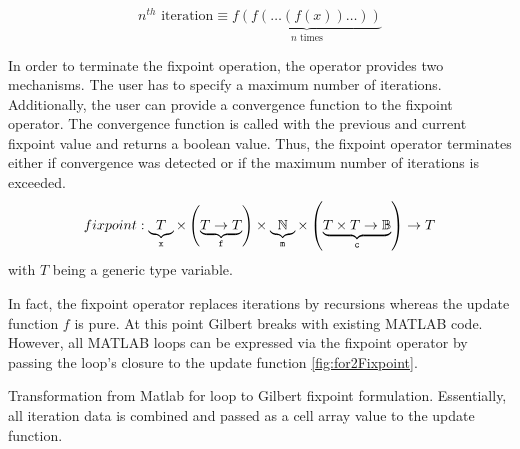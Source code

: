 \begin{displaymath}
  n^{th}\text{ iteration}\equiv\underbrace{f(f(\ldots(f(x))\ldots))}_{\text{$n$ times}}
\end{displaymath}

In order to terminate the fixpoint operation, the operator provides two mechanisms.
The user has to specify a maximum number  of iterations.
Additionally, the user can provide a convergence function  to the fixpoint operator.
The convergence function is called with the previous and current fixpoint value and returns a boolean value.
Thus, the fixpoint operator terminates either if convergence was detected or if the maximum number of iterations is exceeded.
\begin{equation}
fixpoint: \underbrace{T}_{\text{\texttt{x}}} \times \left( \underbrace{T \rightarrow T}_{\text{\texttt{f}}} \right) \times \underbrace{\mathbb{N}}_{\text{\texttt{m}}} \times \left(\underbrace{T\times T \rightarrow \mathbb{B}}_{\text{\texttt{c}}} \right) \rightarrow T
\label{eqn:fixpoint}
\end{equation}
with $T$ being a generic type variable.

In fact, the fixpoint operator replaces iterations by recursions whereas the update function $f$ is pure. At this point Gilbert breaks with existing MATLAB code. However, all MATLAB loops can be expressed via the fixpoint operator by passing the loop's closure to the update function \cref{fig:for2Fixpoint}.

\begin{listing}
  \centering
  \caption{Transformation from Matlab for loop  to Gilbert fixpoint  formulation. Essentially, all iteration data is combined and passed as a cell array value to the update function.}
  \label{fig:for2Fixpoint}
\end{listing}


